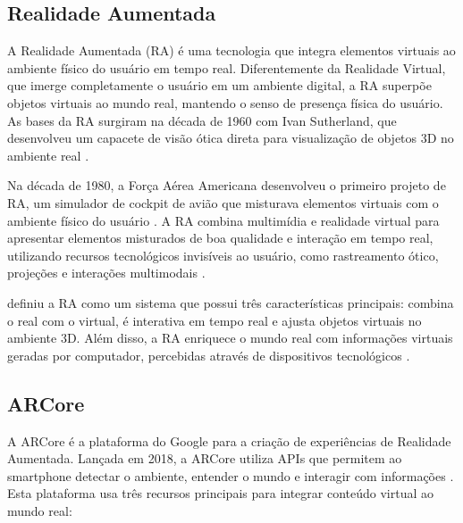 \documentclass[12pt]{article}
\begin{document}
\subsection{Realidade Aumentada}

A Realidade Aumentada (RA) é uma tecnologia que integra elementos virtuais ao ambiente físico do usuário em tempo real. Diferentemente da Realidade Virtual, que imerge completamente o usuário em um ambiente digital, a RA superpõe objetos virtuais ao mundo real, mantendo o senso de presença física do usuário. As bases da RA surgiram na década de 1960 com Ivan Sutherland, que desenvolveu um capacete de visão ótica direta para visualização de objetos 3D no ambiente real \cite{kirner2011evoluccao}.

Na década de 1980, a Força Aérea Americana desenvolveu o primeiro projeto de RA, um simulador de cockpit de avião que misturava elementos virtuais com o ambiente físico do usuário \cite{kirner2011evoluccao}. A RA combina multimídia e realidade virtual para apresentar elementos misturados de boa qualidade e interação em tempo real, utilizando recursos tecnológicos invisíveis ao usuário, como rastreamento ótico, projeções e interações multimodais \cite{kirner2011evoluccao}.

\cite{azuma1997survey} definiu a RA como um sistema que possui três características principais: combina o real com o virtual, é interativa em tempo real e ajusta objetos virtuais no ambiente 3D. Além disso, a RA enriquece o mundo real com informações virtuais geradas por computador, percebidas através de dispositivos tecnológicos \cite{kirner2011evoluccao}.

\subsection{ARCore}\label{sec:arcore}

A ARCore é a plataforma do Google para a criação de experiências de Realidade Aumentada. Lançada em 2018, a ARCore utiliza APIs que permitem ao smartphone detectar o ambiente, entender o mundo e interagir com informações \cite{google_arcore}. Esta plataforma usa três recursos principais para integrar conteúdo virtual ao mundo real:
\end{document}
